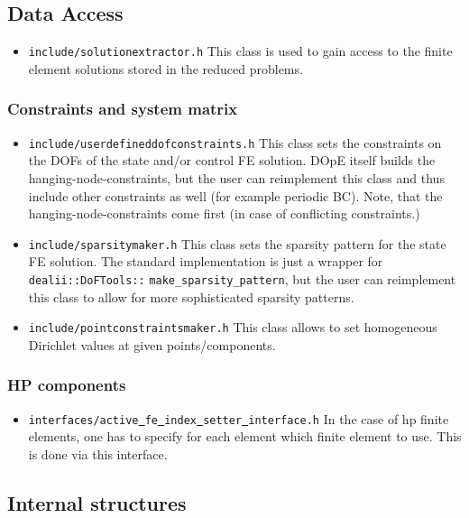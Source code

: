\subsection{Data Access}
\begin{itemize}
\item \texttt{include/solutionextractor.h} This class is used to gain access to the finite element 
  solutions stored in the reduced problems.
\end{itemize}

\subsubsection{Constraints and system matrix}
\begin{itemize}
\item \texttt{include/userdefineddofconstraints.h} This class sets the constraints on the DOFs of the state and/or control FE solution. DOpE itself builds the hanging-node-constraints, but the user can reimplement this class and thus include other constraints as well (for example periodic BC). Note, that the hanging-node-constraints come first (in case of conflicting constraints.)
\item \texttt{include/sparsitymaker.h} This class sets the sparsity pattern for the state FE solution. The standard implementation is just a wrapper for \texttt{dealii::DoFTools::} \texttt{make\_sparsity\_pattern}, but the user can reimplement this class to allow for more sophisticated sparsity patterns.
\item \texttt{include/pointconstraintsmaker.h} This class allows to set 
  homogeneous Dirichlet values at given points/components.
\end{itemize}

\subsubsection{HP components}
\begin{itemize}
\item \texttt{interfaces/active\underline{ }fe\underline{ }index\underline{ }setter\underline{ }interface.h} In the case of hp finite elements, one has to specify for each element which finite element to use. This is done via this interface.
\end{itemize}

\subsection{Internal structures}
